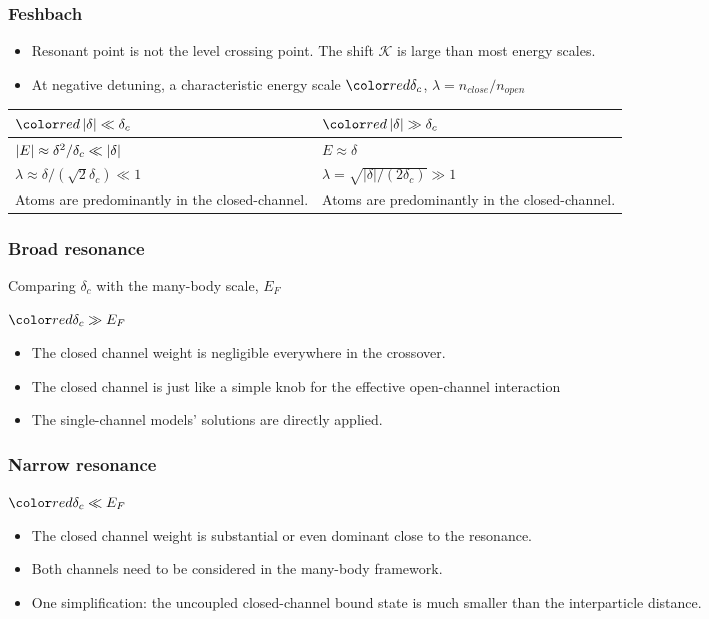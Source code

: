 \begin{frame}
\frametitle{Feshbach }
\begin{itemize}
\item Resonant point is not the level crossing point. The shift $\mathcal{K}$ is large than most energy scales. 
\item At negative detuning, a characteristic energy scale $\mathemph{\delta_c}$, $\lambda=n_{close}/n_{open}$ 

\end{itemize}
\begin{tabular}{|p{4cm}|p{4cm}|}
\hline
 $\mathemph{\abs{\delta}\ll\delta_{c}}$&$\mathemph{\abs{\delta}\gg\delta_{c}}$\\\hline
 $\left\lvert{E}\right\rvert\approx\delta^{2}/\delta_{c}\ll\left\lvert{\delta}\right\rvert$&$E\approx\delta$\\\hline $\lambda\approx{\delta/(\sqrt{2}\delta_{c})}\ll1$& 
 $\lambda=\sqrt{|\delta|/(2\delta_{c})}\gg1$\\\hline
 Atoms are predominantly in the closed-channel.&Atoms are predominantly in the closed-channel.\\
 \hline
\end{tabular}
\end{frame}

\begin{frame}
        \frametitle{Broad resonance}
        Comparing $\delta_c$ with the many-body scale, $E_F$
 
       $\mathemph{\delta_c\gg{}E_F}$
        \begin{itemize}

\item The closed channel weight is negligible everywhere in the crossover.
\item The closed channel is just like a simple knob for the effective open-channel interaction
\item The single-channel models' solutions are directly applied.
\end{itemize}
   
\end{frame}

\begin{frame}
        \frametitle{Narrow resonance}
        
 
       $\mathemph{\delta_c\ll{}E_F}$
        \begin{itemize}

\item The closed channel weight is substantial or even dominant close to the resonance.
\item Both channels need to be considered in the many-body framework. 
\item One simplification: the uncoupled closed-channel bound state is much smaller than the interparticle distance. 
\end{itemize}
\end{frame}


